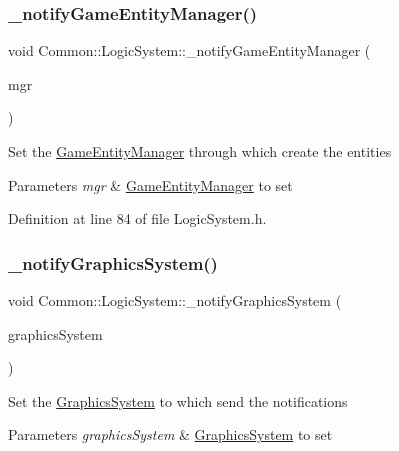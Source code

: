 \subsubsection{\texorpdfstring{\+\_\+notify\+Game\+Entity\+Manager()}{\_notifyGameEntityManager()}}
{\footnotesize\ttfamily void Common\+::\+Logic\+System\+::\+\_\+notify\+Game\+Entity\+Manager (\begin{DoxyParamCaption}\item[{\hyperlink{class_common_1_1_game_entity_manager}{Game\+Entity\+Manager} $\ast$}]{mgr }\end{DoxyParamCaption})\hspace{0.3cm}{\ttfamily [inline]}}

Set the \hyperlink{class_common_1_1_game_entity_manager}{Game\+Entity\+Manager} through which create the entities 
\begin{DoxyParams}{Parameters}
{\em mgr} & \hyperlink{class_common_1_1_game_entity_manager}{Game\+Entity\+Manager} to set \\
\hline
\end{DoxyParams}


Definition at line 84 of file Logic\+System.\+h.

\mbox{\label{class_common_1_1_logic_system_a0897460fb4f985b0bd85c2d130b9d585}} 
\subsubsection{\texorpdfstring{\+\_\+notify\+Graphics\+System()}{\_notifyGraphicsSystem()}}
{\footnotesize\ttfamily void Common\+::\+Logic\+System\+::\+\_\+notify\+Graphics\+System (\begin{DoxyParamCaption}\item[{\hyperlink{class_common_1_1_base_system}{Base\+System} $\ast$}]{graphics\+System }\end{DoxyParamCaption})\hspace{0.3cm}{\ttfamily [inline]}}

Set the \hyperlink{class_common_1_1_graphics_system}{Graphics\+System} to which send the notifications 
\begin{DoxyParams}{Parameters}
{\em graphics\+System} & \hyperlink{class_common_1_1_graphics_system}{Graphics\+System} to set \\
\hline
\end{DoxyParams}


